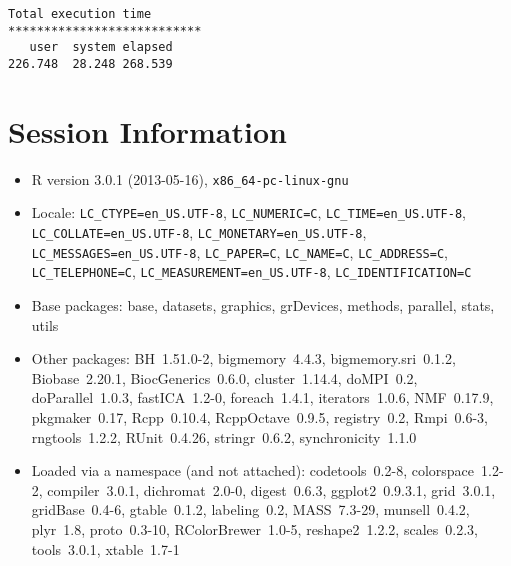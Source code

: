 \documentclass[10pt]{article}\usepackage[]{graphicx}\usepackage[]{color}
\begin{document}
\begin{verbatim}
Total execution time
***************************
   user  system elapsed 
226.748  28.248 268.539 

\end{verbatim}

\section*{Session Information}
\begin{itemize}\raggedright
  \item R version 3.0.1 (2013-05-16), \verb|x86_64-pc-linux-gnu|
  \item Locale: \verb|LC_CTYPE=en_US.UTF-8|, \verb|LC_NUMERIC=C|, \verb|LC_TIME=en_US.UTF-8|, \verb|LC_COLLATE=en_US.UTF-8|, \verb|LC_MONETARY=en_US.UTF-8|, \verb|LC_MESSAGES=en_US.UTF-8|, \verb|LC_PAPER=C|, \verb|LC_NAME=C|, \verb|LC_ADDRESS=C|, \verb|LC_TELEPHONE=C|, \verb|LC_MEASUREMENT=en_US.UTF-8|, \verb|LC_IDENTIFICATION=C|
  \item Base packages: base, datasets, graphics, grDevices, methods,
    parallel, stats, utils
  \item Other packages: BH~1.51.0-2, bigmemory~4.4.3,
    bigmemory.sri~0.1.2, Biobase~2.20.1, BiocGenerics~0.6.0,
    cluster~1.14.4, doMPI~0.2, doParallel~1.0.3, fastICA~1.2-0,
    foreach~1.4.1, iterators~1.0.6, NMF~0.17.9, pkgmaker~0.17,
    Rcpp~0.10.4, RcppOctave~0.9.5, registry~0.2, Rmpi~0.6-3,
    rngtools~1.2.2, RUnit~0.4.26, stringr~0.6.2, synchronicity~1.1.0
  \item Loaded via a namespace (and not attached): codetools~0.2-8,
    colorspace~1.2-2, compiler~3.0.1, dichromat~2.0-0, digest~0.6.3,
    ggplot2~0.9.3.1, grid~3.0.1, gridBase~0.4-6, gtable~0.1.2,
    labeling~0.2, MASS~7.3-29, munsell~0.4.2, plyr~1.8, proto~0.3-10,
    RColorBrewer~1.0-5, reshape2~1.2.2, scales~0.2.3, tools~3.0.1,
    xtable~1.7-1
\end{itemize}
\end{document}
